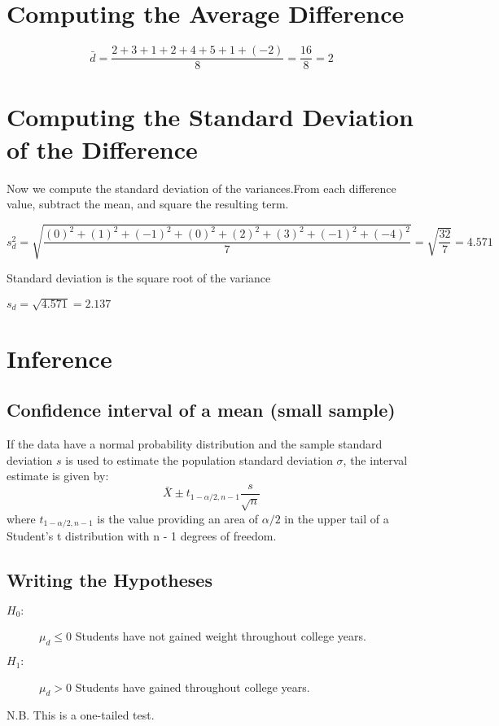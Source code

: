 \documentclass[a4paper,12pt]{article}
\begin{document}
\section*{Computing the Average Difference}

\[ \bar{d} = \frac{2+3+1+2+4+5+1+(-2)}{8} = \frac{16}{8} =2\]

\section*{Computing the Standard Deviation of the Difference}

Now we compute the standard deviation of the variances.From each difference value, subtract the mean, and square the resulting term.

\[ s^2_{d} = \sqrt{\frac{(0)^2+(1)^2+(-1)^2+(0)^2+(2)^2+(3)^2+(-1)^2+(-4)^2}{7}}= \sqrt{\frac{32}{7}} = 4.571\]

\noindent Standard deviation is the square root of the variance

$s_d=\sqrt{4.571}={2.137}$


\section{Inference}

\subsection{Confidence interval of a mean (small sample)}

If the data have a normal probability distribution and the sample
standard deviation $s$ is used to estimate the population
standard deviation $\sigma$, the interval estimate is given by:
\begin{equation}
\bar{X} \pm t_{1-\alpha/2,n-1}\frac{s}{\sqrt{n}}
\end{equation}
where $t_{1-\alpha/2,n-1}$ is the value providing an area of $\alpha/2$ in the upper tail of a Student’s t distribution with n - 1 degrees of freedom.


\subsection*{Writing the Hypotheses}

\begin{description}
\item[$H_0:$] $\mu_d \leq 0$ Students have not gained weight throughout college years.
\item[$H_1:$] $\mu_d > 0$ Students have gained throughout college years.
\end{description}

N.B. This is a one-tailed test.
\end{document}
